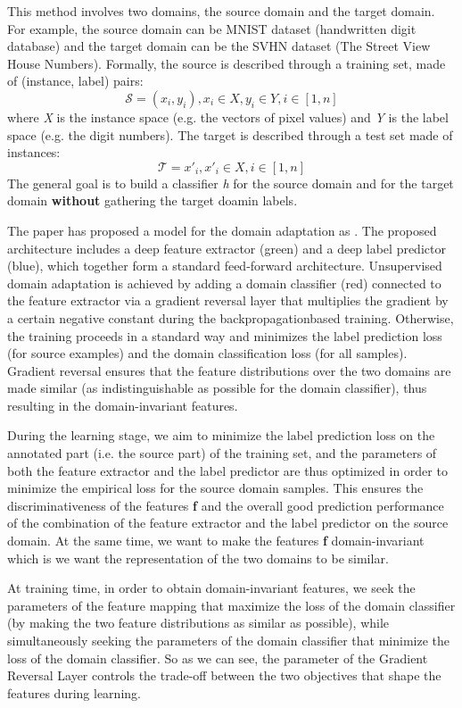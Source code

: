This method involves two domains, the source domain and the target domain.  For example, the source domain can be MNIST dataset (handwritten digit database) and the target domain can be the SVHN dataset (The Street View House Numbers). Formally, the source is described through a training set, made of (instance, label) pairs:
\[ \mathcal{ S} = {(x_{i},y_{i}), x_{i} \in X, y_{i} \in Y, i \in [1,n]}  \]
where \textit{X} is the instance space (e.g. the vectors of pixel values) and \textit{Y} is the label space (e.g. the digit numbers). The target is described through a test set made of instances:
\[ \mathcal{T} = x'_{i}, x'_{i} \in X, i \in [1,n] \]
The general goal is to build a classifier \textit{h} for the source domain and for the target domain \textbf{without} gathering the target doamin labels.

The paper has proposed a model for the domain adaptation as . The proposed architecture includes a deep feature extractor (green) and a deep label predictor (blue), which together form a standard feed-forward architecture. Unsupervised domain adaptation is achieved by adding a domain classifier (red) connected to the feature extractor via a gradient reversal layer that multiplies the gradient by a certain negative constant during the backpropagationbased training. Otherwise, the training proceeds in a standard way and minimizes the label prediction loss (for source examples) and the domain classification loss (for all samples). Gradient reversal ensures that the feature distributions over the two domains are made similar (as indistinguishable as possible for the domain classifier), thus resulting in the domain-invariant features.

During the learning stage, we aim to minimize the label prediction loss on the annotated part (i.e. the source part) of the training set, and the parameters of both the feature extractor and the label predictor are thus optimized in order to minimize the empirical loss for the source domain samples. This ensures the discriminativeness of the features \textbf{f} and the overall good prediction performance of the combination of the feature extractor and the label predictor on the source domain. At the same time, we want to make the features \textbf{f} domain-invariant which is we want the representation of the two domains to be similar.

At training time, in order to obtain domain-invariant features, we seek the parameters of the feature mapping that maximize the loss of the domain classifier (by making the two feature distributions as similar as possible), while simultaneously seeking the parameters of the domain classifier that minimize the loss of the domain classifier. So as we can see, the parameter \lambda of the Gradient Reversal Layer controls the trade-off between the two objectives that shape the features during learning.

